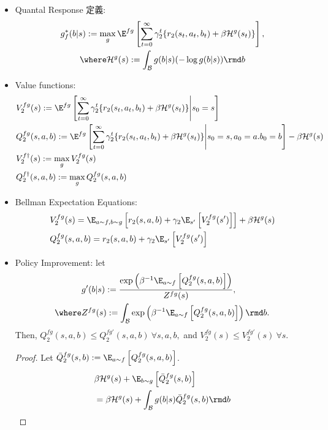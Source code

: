 \documentclass[a4paper,10pt,dvipdfmx]{jsarticle}
\begin{document}
\begin{itemize}
    \item Quantal Response 定義:
    \begin{gather}
        g_f^*(b|s):=\max_{g}\E^{fg}\left[\sum_{t=0}^\infty \gamma_2^t\{r_2(s_t,a_t,b_t)+\beta\mathcal{H}^g(s_t)\}\right],\\
        \where \mathcal{H}^g(s):=\int_{\mathcal{B}}g(b|s)(-\log g(b|s))\rmd b
    \end{gather}
    \item Value functions:
    \begin{align}
        &V_2^{fg}(s):=\E^{fg}\left[\sum_{t=0}^\infty \gamma_2^t\{r_2(s_t,a_t,b_t)+\beta\mathcal{H}^g(s_t)\}\middle|s_0=s\right]\\
        &Q_2^{fg}(s,a,b):=\E^{fg}\left[\sum_{t=0}^\infty \gamma_2^t\{r_2(s_t,a_t,b_t)+\beta\mathcal{H}^g(s_t)\}\middle|s_0=s,a_0=a.b_0=b\right]-\beta\mathcal{H}^g(s)\\
        &V_2^{f\dag}(s):=\max_{g}V_2^{fg}(s)\\
        &Q_2^{f\dag}(s,a,b):=\max_{g}Q_2^{fg}(s,a,b)
    \end{align}
    \item Bellman Expectation Equations:
    \begin{align}
        &V_2^{fg}(s)=\E_{a\sim f,b\sim g}\left[r_2(s,a,b)+\gamma_2\E_{s'}\left[V_2^{fg}(s')\right]\right]+\beta\mathcal{H}^g(s)\\
        &Q_2^{fg}(s,a,b)=r_2(s,a,b)+\gamma_2\E_{s'}\left[V_2^{fg}(s')\right]
    \end{align}
    \item Policy Improvement: let
    \begin{align}
        &g'(b|s):=\dfrac{\exp\left(\beta^{-1}\E_{a\sim f}\left[Q_2^{fg}(s,a,b)\right]\right)}{Z^{fg}(s)},\\
        \where &Z^{fg}(s):=\int_{\mathcal{B}}\exp\left(\beta^{-1}\E_{a\sim f}\left[Q_2^{fg}(s,a,b)\right]\right)\rmd b.
    \end{align}
    Then, $Q_2^{fg}(s,a,b)\le Q_2^{fg'}(s,a,b)~\forall s,a,b,$ and $V_2^{fg}(s)\le V_2^{fg'}(s)~\forall s.$
    \begin{proof}
        Let $\bar{Q}_2^{fg}(s,b):=\E_{a\sim f}\left[Q_2^{fg}(s,a,b)\right]$.
        \begin{align}
            &\beta\mathcal{H}^g(s)+\E_{b\sim g}\left[\bar{Q}_2^{fg}(s,b)\right]\\
            &=\beta\mathcal{H}^g(s)+\int_{\mathcal{B}}g(b|s)\bar{Q}_2^{fg}(s,b)\rmd b\\

\end{align}
\end{proof}
\end{itemize}
\end{document}
